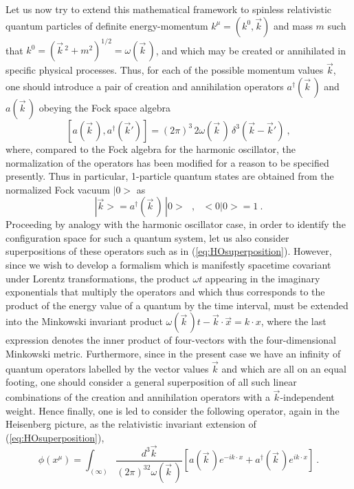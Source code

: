 \documentclass[a4paper,11pt]{article}
\begin{document}
Let us now try to extend this mathematical framework to spinless 
re\-la\-tivistic
quantum particles of definite energy-momentum $k^\mu=(k^0,\vec{k})$
and mass $m$ such that $k^0=(\vec{k}\,^2+m^2)^{1/2}=\omega(\vec{k}\,)$,
and which may be created or annihilated in specific physical processes. 
Thus, for each of the possible
momentum values $\vec{k}$, one should introduce a pair of creation
and annihilation operators $a^\dagger(\vec{k}\,)$ and $a(\vec{k}\,)$
obeying the Fock space algebra
\begin{equation}
\left[a(\vec{k}\,),a^\dagger(\vec{k}')\right]=
(2\pi)^3\,2\omega(\vec{k}\,)\,\delta^{3}(\vec{k}-\vec{k}')\ ,
\label{eq:Fockparticle}
\end{equation}
where, compared to the Fock algebra for the harmonic oscillator,
the normalization of the operators has been modified for a reason
to be specified presently. Thus in particular, 1-particle quantum states
are obtained from the normalized Fock vacuum $|0>$ as
\begin{equation}
|\vec{k}>=a^\dagger(\vec{k}\,)\,|0>\ \ \ ,\ \ \ 
<0|0>=1\ .
\end{equation}
Proceeding by analogy with the harmonic oscillator case, in order
to identify the configuration space for such a quantum system,
let us also consider superpositions of these operators such as in
(\ref{eq:HOsuperposition}). However, since we wish to develop a
formalism which is manifestly spacetime covariant under Lorentz
transformations, the product $\omega t$ appearing in the imaginary
exponentials that multiply the operators and which thus corresponds to
the product of the energy value of a quantum by the time interval,
must be extended into the Minkowski invariant product 
$\omega(\vec{k}\,)t-\vec{k}\cdot\vec{x}=k\cdot x$, where the last
expression denotes the inner product of four-vectors with the 
four-dimensional Minkowski metric. Furthermore, since in the present case
we have an infinity of quantum operators labelled by the vector values
$\vec{k}$ and which are all on an equal footing, one should consider a general
superposition of all such linear combinations of the creation and
annihilation operators with a $\vec{k}$-independent weight. Hence finally, 
one is led to consider the following operator, again in the Heisenberg picture,
as the relativistic invariant extension of (\ref{eq:HOsuperposition}),
\begin{equation}
\hat{\phi}(x^\mu)=\int_{(\infty)}\frac{d^3\vec{k}}{(2\pi)^32\omega(\vec{k}\,)}
\left[a(\vec{k}\,)e^{-ik\cdot x}+a^\dagger(\vec{k}\,)e^{ik\cdot x}\right]\ .
\label{eq:fieldparticle}
\end{equation}
\end{document}
